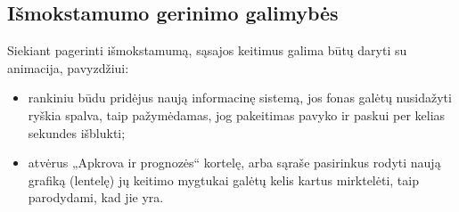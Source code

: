\subsection{Išmokstamumo gerinimo galimybės}

Siekiant pagerinti išmokstamumą, sąsajos keitimus galima būtų
daryti su animacija, pavyzdžiui:
\begin{itemize}
  \item rankiniu būdu pridėjus naują informacinę sistemą, jos
    fonas galėtų nusidažyti ryškia spalva, taip pažymėdamas, jog
    pakeitimas pavyko ir paskui per kelias sekundes išblukti;
  \item atvėrus „Apkrova ir prognozės“ kortelę, arba sąraše pasirinkus
    rodyti naują grafiką (lentelę) jų keitimo mygtukai galėtų kelis
    kartus mirktelėti, taip parodydami, kad jie yra.
\end{itemize}
